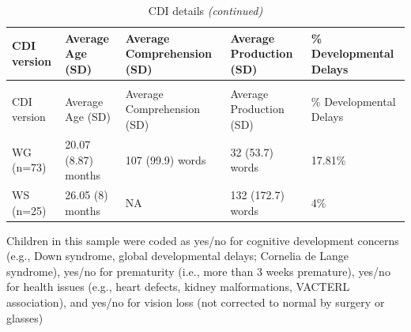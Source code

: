 \documentclass[english,man]{apa6}
\begin{document}
\begin{longtable}[t]{l|l|l|l|l}
\caption{\label{tab:CDIinfo}CDI details}\\
\hline
CDI version & Average Age (SD) & Average Comprehension (SD) & Average Production (SD) & \% Developmental Delays\\
\hline
\endfirsthead
\caption[]{\label{tab:CDIinfo}CDI details \textit{(continued)}}\\
\hline
CDI version & Average Age (SD) & Average Comprehension (SD) & Average Production (SD) & \% Developmental Delays\\
\hline
\endhead
WG (n=73) & 20.07 (8.87) months & 107 (99.9) words & 32 (53.7) words & 17.81\%\\
\hline
WS (n=25) & 26.05 (8) months & NA & 132 (172.7) words & 4\%\\
\hline
\end{longtable}

Children in this sample were coded as yes/no for cognitive development concerns (e.g., Down syndrome, global developmental delays; Cornelia de Lange syndrome), yes/no for prematurity (i.e., more than 3 weeks premature), yes/no for health issues (e.g., heart defects, kidney malformations, VACTERL association), and yes/no for vision loss (not corrected to normal by surgery or glasses)
\end{document}
